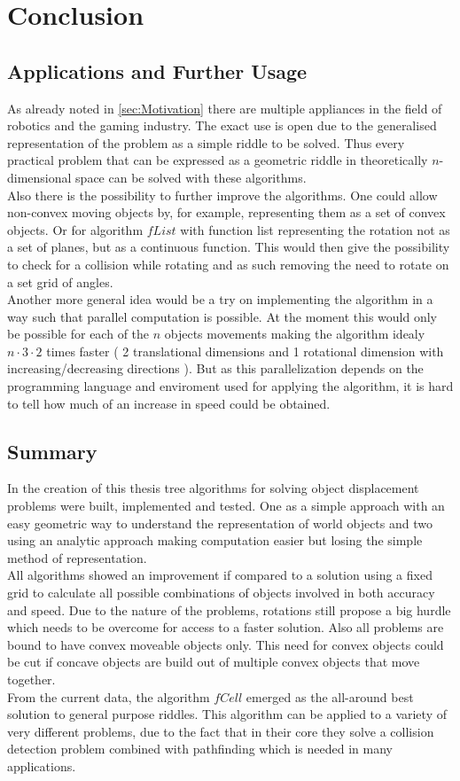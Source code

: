 \chapter{Conclusion}
\section{Applications and Further Usage}
As already noted in \ref{sec:Motivation} there are multiple appliances in the field of robotics and the gaming industry. The exact use is open due to the generalised representation of the problem as a simple riddle to be solved. Thus every practical problem that can be expressed as a geometric riddle in theoretically $n$-dimensional space can be solved with these algorithms.\\
Also there is the possibility to further improve the algorithms. One could allow non-convex moving objects by, for example, representing them as a set of convex objects. Or for algorithm $fList$ with function list representing the rotation not as a set of planes, but as a continuous function.  This would then give the possibility to check for a collision while rotating and as such removing the need to rotate on a set grid of angles.\\
Another more general idea would be a try on implementing the algorithm in a way such that parallel computation is possible. At the moment this would only be possible for each of the $n$ objects movements making the algorithm idealy $n\cdot3\cdot2$ times faster ( 2 translational dimensions and 1 rotational dimension with increasing/decreasing directions ). But as this parallelization depends on the programming language and enviroment used for applying the algorithm, it is hard to tell how much of an increase in speed could be obtained.
\section{Summary}
In the creation of this thesis tree algorithms for solving object displacement problems were built, implemented and tested. One as a simple approach with an easy geometric way to understand the representation of world objects and two using an analytic approach making computation easier but losing the simple method of representation. \\
All algorithms showed an improvement if compared to a solution using a fixed grid to calculate all possible combinations of objects involved in both accuracy and speed. Due to the nature of the problems, rotations still propose a big hurdle which needs to be overcome for access to a faster solution. Also all problems are bound to have convex moveable objects only. This need for convex objects could be cut if concave objects are build out of multiple convex objects that move together.\\
From the current data, the algorithm $fCell$ emerged as the all-around best solution to general purpose riddles. This algorithm can be applied to a variety of very different problems, due to the fact that in their core they solve a collision detection problem combined with pathfinding which is needed in many applications.   